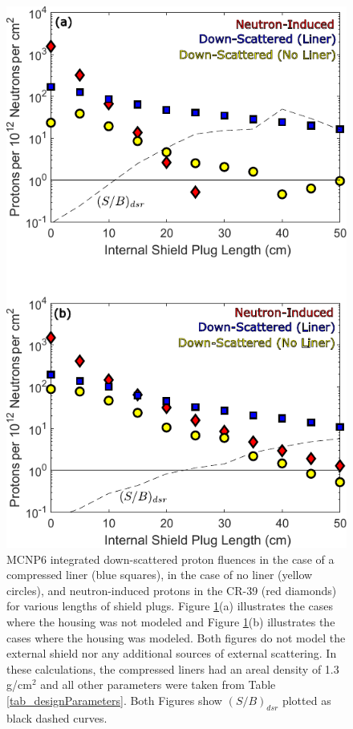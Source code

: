 \begin{figure}[h!]
	
	\centering
	\includegraphics[scale=1.2]{Figures/S2B_Housing.pdf}
	\caption{MCNP6 integrated down-scattered proton fluences in the case of a compressed liner (blue squares), in the case of no liner (yellow circles), and neutron-induced protons in the CR-39 (red diamonds) for various lengths of shield plugs. Figure \ref{fig_signal2BackgroundHousing}(a) illustrates the cases where the housing was not modeled and Figure \ref{fig_signal2BackgroundHousing}(b) illustrates the cases where the housing was modeled. Both figures do not model the external shield nor any additional sources of external scattering. In these calculations, the compressed liners had an areal density of 1.3 g/cm$^2$ and all other parameters were taken from Table \ref{tab_designParameters}. Both Figures show $(S/B)_{dsr}$ plotted as black dashed curves. }
	\label{fig_signal2BackgroundHousing}
	
\end{figure}

